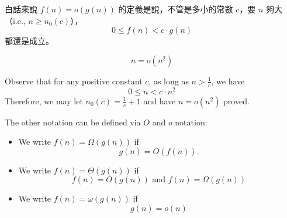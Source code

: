 \vspace{1em}

白話來說 $f(n) = o(g(n))$ 的定義是說，不管是多小的常數 $c$，要 $n$ 夠大（i.e., $n \geq n_0(c)$），
\[
0 \leq f(n) < c \cdot g(n)
\]
都還是成立。

\begin{eg}
$$n = o(n^2)$$
\end{eg}
\vspace{0.5em}
Observe that for any positive constant $c$, as long as $n > \frac{1}{c}$, we have 
\[
0 \leq n < c\cdot n^2
\]
Therefore, we may let $n_0(c) = \frac{1}{c} + 1$ and have $n = o(n^2)$ proved.

\begin{definition}
    The other notation can be defined via $O$ and $o$ notation:
    \begin{itemize}
        \item We write $f(n) = \Omega(g(n))$ if \[
            g(n) = O(f(n)).
        \]
        \item We write $f(n) = \Theta(g(n))$ if \[
            f(n) = O(g(n)) \text{ and } f(n) = \Omega(g(n))
        \]
        \item We write $f(n) = \omega(g(n))$ if \[
            g(n) = o(n)
        \]
    \end{itemize}
\end{definition}